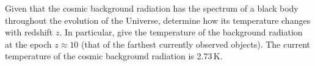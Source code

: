 Given that the cosmic background radiation has the spectrum of a black body
throughout the evolution of the Universe, determine how its temperature
changes with redshift $z$. In particular, give the temperature of the
background radiation at the epoch $z \approx 10$ (that of the farthest
currently observed objects). The current temperature of the cosmic background
radiation is 2.73\,K.
